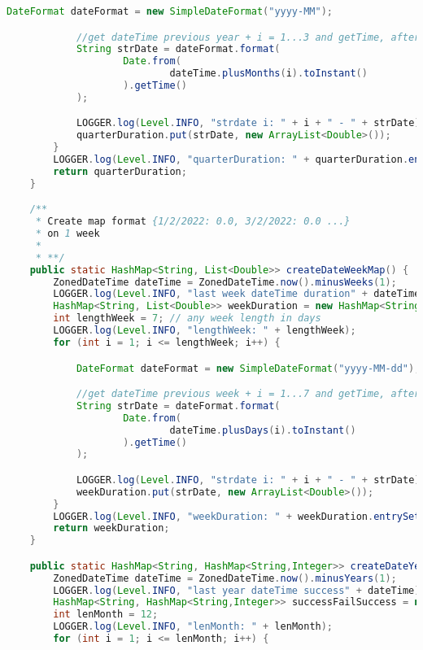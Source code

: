 \begin{lstlisting}[language=Java]
            DateFormat dateFormat = new SimpleDateFormat("yyyy-MM");

            //get dateTime previous year + i = 1...3 and getTime, after in strDate=2022-03
            String strDate = dateFormat.format(
                    Date.from(
                            dateTime.plusMonths(i).toInstant()
                    ).getTime()
            );

            LOGGER.log(Level.INFO, "strdate i: " + i + " - " + strDate);
            quarterDuration.put(strDate, new ArrayList<Double>());
        }
        LOGGER.log(Level.INFO, "quarterDuration: " + quarterDuration.entrySet());
        return quarterDuration;
    }

    /**
     * Create map format {1/2/2022: 0.0, 3/2/2022: 0.0 ...}
     * on 1 week
     *
     * **/
    public static HashMap<String, List<Double>> createDateWeekMap() {
        ZonedDateTime dateTime = ZonedDateTime.now().minusWeeks(1);
        LOGGER.log(Level.INFO, "last week dateTime duration" + dateTime);
        HashMap<String, List<Double>> weekDuration = new HashMap<String, List<Double>>();
        int lengthWeek = 7; // any week length in days
        LOGGER.log(Level.INFO, "lengthWeek: " + lengthWeek);
        for (int i = 1; i <= lengthWeek; i++) {

            DateFormat dateFormat = new SimpleDateFormat("yyyy-MM-dd");

            //get dateTime previous week + i = 1...7 and getTime, after in strDate=2022-03-01
            String strDate = dateFormat.format(
                    Date.from(
                            dateTime.plusDays(i).toInstant()
                    ).getTime()
            );

            LOGGER.log(Level.INFO, "strdate i: " + i + " - " + strDate);
            weekDuration.put(strDate, new ArrayList<Double>());
        }
        LOGGER.log(Level.INFO, "weekDuration: " + weekDuration.entrySet());
        return weekDuration;
    }

    public static HashMap<String, HashMap<String,Integer>> createDateYearMapSuccessRate() {
        ZonedDateTime dateTime = ZonedDateTime.now().minusYears(1);
        LOGGER.log(Level.INFO, "last year dateTime success" + dateTime);
        HashMap<String, HashMap<String,Integer>> successFailSuccess = new HashMap();
        int lenMonth = 12;
        LOGGER.log(Level.INFO, "lenMonth: " + lenMonth);
        for (int i = 1; i <= lenMonth; i++) {


\end{lstlisting}
